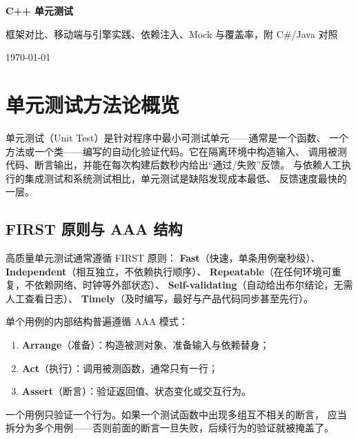 \documentclass[12pt,a4paper,fontset=fandol]{ctexbook}
\begin{document}
\frontmatter

\begin{titlepage}
\centering
\vspace*{4cm}
{\Huge\bfseries C++ 单元测试\par}
\vspace{1cm}
{\LARGE 框架对比、移动端与引擎实践、依赖注入、Mock 与覆盖率，附 C\#/Java 对照\par}
\vfill
{\large \today\par}
\end{titlepage}

\tableofcontents

\mainmatter

\chapter{单元测试方法论概览}

单元测试（Unit Test）是针对程序中最小可测试单元——通常是一个函数、
一个方法或一个类——编写的自动化验证代码。它在隔离环境中构造输入、
调用被测代码、断言输出，并能在每次构建后数秒内给出“通过/失败”反馈。
与依赖人工执行的集成测试和系统测试相比，单元测试是缺陷发现成本最低、
反馈速度最快的一层。

\section{FIRST 原则与 AAA 结构}

高质量单元测试通常遵循 FIRST 原则：
\textbf{Fast}（快速，单条用例毫秒级）、
\textbf{Independent}（相互独立，不依赖执行顺序）、
\textbf{Repeatable}（在任何环境可重复，不依赖网络、时钟等外部状态）、
\textbf{Self-validating}（自动给出布尔结论，无需人工查看日志）、
\textbf{Timely}（及时编写，最好与产品代码同步甚至先行）。

单个用例的内部结构普遍遵循 AAA 模式：

\begin{enumerate}
  \item \textbf{Arrange}（准备）：构造被测对象、准备输入与依赖替身；
  \item \textbf{Act}（执行）：调用被测函数，通常只有一行；
  \item \textbf{Assert}（断言）：验证返回值、状态变化或交互行为。
\end{enumerate}

\begin{note}
一个用例只验证一个行为。如果一个测试函数中出现多组互不相关的断言，
应当拆分为多个用例——否则前面的断言一旦失败，后续行为的验证就被掩盖了。
\end{note}
\end{document}
